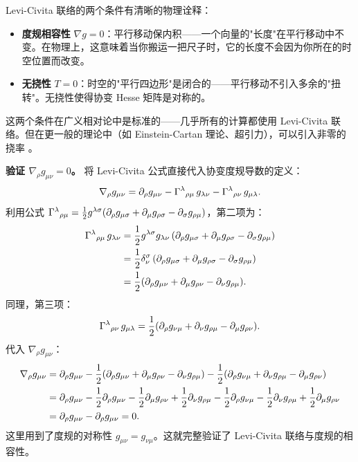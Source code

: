 \begin{note}[物理意义]
Levi-Civita 联络的两个条件有清晰的物理诠释：
\begin{itemize}
    \item \textbf{度规相容性} $\nabla g = 0$：平行移动保内积——一个向量的"长度"在平行移动中不变。在物理上，这意味着当你搬运一把尺子时，它的长度不会因为你所在的时空位置而改变。
    \item \textbf{无挠性} $T=0$：时空的"平行四边形"是闭合的——平行移动不引入多余的"扭转"。无挠性使得协变 Hesse 矩阵是对称的。
\end{itemize}
这两个条件在广义相对论中是标准的——几乎所有的计算都使用 Levi-Civita 联络。但在更一般的理论中（如 Einstein-Cartan 理论、超引力），可以引入非零的挠率 \cite{Wald1984}。
\end{note}

\medskip
\noindent\textbf{验证 $\nabla_\rho g_{\mu\nu} = 0$。}\quad
将 Levi-Civita 公式直接代入协变度规导数的定义：
\begin{equation}
    \nabla_\rho g_{\mu\nu} = \partial_\rho g_{\mu\nu} - \Gamma^\lambda{}_{\rho\mu}\, g_{\lambda\nu} - \Gamma^\lambda{}_{\rho\nu}\, g_{\mu\lambda}.
\end{equation}
利用公式 $\Gamma^\lambda{}_{\rho\mu} = \frac12 g^{\lambda\sigma}(\partial_\rho g_{\mu\sigma} + \partial_\mu g_{\rho\sigma} - \partial_\sigma g_{\rho\mu})$，第二项为：
\begin{align}
    \Gamma^\lambda{}_{\rho\mu}\, g_{\lambda\nu} 
    &= \frac12 g^{\lambda\sigma} g_{\lambda\nu}\,(\partial_\rho g_{\mu\sigma} + \partial_\mu g_{\rho\sigma} - \partial_\sigma g_{\rho\mu}) \\
    &= \frac12 \delta^\sigma_\nu\,(\partial_\rho g_{\mu\sigma} + \partial_\mu g_{\rho\sigma} - \partial_\sigma g_{\rho\mu}) \\
    &= \frac12 (\partial_\rho g_{\mu\nu} + \partial_\mu g_{\rho\nu} - \partial_\nu g_{\rho\mu}).
\end{align}
同理，第三项：
\begin{equation}
    \Gamma^\lambda{}_{\rho\nu}\, g_{\mu\lambda} = \frac12 (\partial_\rho g_{\nu\mu} + \partial_\nu g_{\rho\mu} - \partial_\mu g_{\rho\nu}).
\end{equation}
代入 $\nabla_\rho g_{\mu\nu}$：
\begin{align}
    \nabla_\rho g_{\mu\nu} 
    &= \partial_\rho g_{\mu\nu} 
       - \frac12(\partial_\rho g_{\mu\nu} + \partial_\mu g_{\rho\nu} - \partial_\nu g_{\rho\mu})
       - \frac12(\partial_\rho g_{\nu\mu} + \partial_\nu g_{\rho\mu} - \partial_\mu g_{\rho\nu}) \\
    &= \partial_\rho g_{\mu\nu} 
       - \frac12\partial_\rho g_{\mu\nu} - \frac12\partial_\mu g_{\rho\nu} + \frac12\partial_\nu g_{\rho\mu}
       - \frac12\partial_\rho g_{\nu\mu} - \frac12\partial_\nu g_{\rho\mu} + \frac12\partial_\mu g_{\rho\nu} \\
    &= \partial_\rho g_{\mu\nu} - \partial_\rho g_{\mu\nu} = 0.
\end{align}
这里用到了度规的对称性 $g_{\mu\nu} = g_{\nu\mu}$。这就完整验证了 Levi-Civita 联络与度规的相容性。

